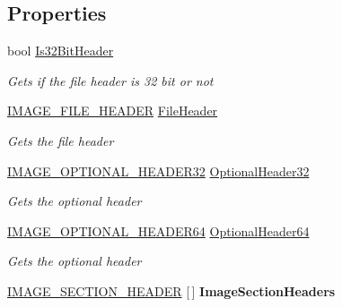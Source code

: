 \subsection*{Properties}
\begin{DoxyCompactItemize}
\item 
bool \mbox{\hyperlink{class_class_library_server_1_1_struct_1_1_pe_header_reader_a70b0b598170cd9f084a60efdd897d526}{Is32\+Bit\+Header}}
\begin{DoxyCompactList}\small\item\em Gets if the file header is 32 bit or not \end{DoxyCompactList}\item 
\mbox{\hyperlink{struct_class_library_server_1_1_struct_1_1_i_m_a_g_e___f_i_l_e___h_e_a_d_e_r}{I\+M\+A\+G\+E\+\_\+\+F\+I\+L\+E\+\_\+\+H\+E\+A\+D\+ER}} \mbox{\hyperlink{class_class_library_server_1_1_struct_1_1_pe_header_reader_a579b0dbda74804312c60d185e08d741a}{File\+Header}}
\begin{DoxyCompactList}\small\item\em Gets the file header \end{DoxyCompactList}\item 
\mbox{\hyperlink{struct_class_library_server_1_1_struct_1_1_pe_header_reader_1_1_i_m_a_g_e___o_p_t_i_o_n_a_l___h_e_a_d_e_r32}{I\+M\+A\+G\+E\+\_\+\+O\+P\+T\+I\+O\+N\+A\+L\+\_\+\+H\+E\+A\+D\+E\+R32}} \mbox{\hyperlink{class_class_library_server_1_1_struct_1_1_pe_header_reader_a5f6932bd2acdcf923da759641e5f96da}{Optional\+Header32}}
\begin{DoxyCompactList}\small\item\em Gets the optional header \end{DoxyCompactList}\item 
\mbox{\hyperlink{struct_class_library_server_1_1_struct_1_1_pe_header_reader_1_1_i_m_a_g_e___o_p_t_i_o_n_a_l___h_e_a_d_e_r64}{I\+M\+A\+G\+E\+\_\+\+O\+P\+T\+I\+O\+N\+A\+L\+\_\+\+H\+E\+A\+D\+E\+R64}} \mbox{\hyperlink{class_class_library_server_1_1_struct_1_1_pe_header_reader_a9c6cded962ede1bde04a1506123657b5}{Optional\+Header64}}
\begin{DoxyCompactList}\small\item\em Gets the optional header \end{DoxyCompactList}\item 
\mbox{\label{class_class_library_server_1_1_struct_1_1_pe_header_reader_a96f05bc300d0a1130fe2b2ebc8fe1436}} 
\mbox{\hyperlink{struct_class_library_server_1_1_struct_1_1_pe_header_reader_1_1_i_m_a_g_e___s_e_c_t_i_o_n___h_e_a_d_e_r}{I\+M\+A\+G\+E\+\_\+\+S\+E\+C\+T\+I\+O\+N\+\_\+\+H\+E\+A\+D\+ER}} \mbox{[}$\,$\mbox{]} {\bfseries Image\+Section\+Headers}
\end{DoxyCompactItemize}


